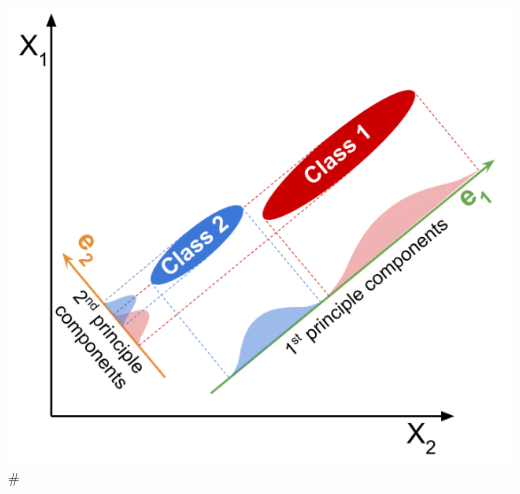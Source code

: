 \documentclass[english]{latex4ei/latex4ei_sheet}
\begin{document}
\begin{center}
	    \includegraphics[width = 0.7\columnwidth]{figures/PCA_case3.png}#
	\end{center}
\end{document}
